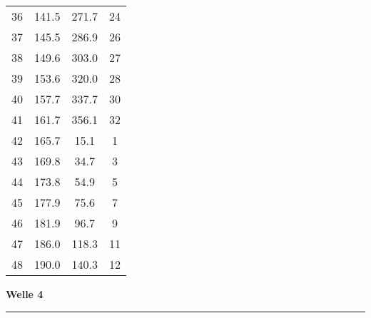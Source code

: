 \documentclass[10pt, a4paper]{article}
\begin{document}
\begin{center}
\begin{tabular}{c|c|c|c}
		36 & 141.5 & 271.7 & 24 \\
		37 & 145.5 & 286.9 & 26 \\
		38 & 149.6 & 303.0 & 27 \\
		39 & 153.6 & 320.0 & 28 \\
		40 & 157.7 & 337.7 & 30 \\
		41 & 161.7 & 356.1 & 32 \\
		42 & 165.7 & 15.1 & 1 \\
		43 & 169.8 & 34.7 & 3 \\
		44 & 173.8 & 54.9 & 5 \\
		45 & 177.9 & 75.6 & 7 \\
		46 & 181.9 & 96.7 & 9 \\
		47 & 186.0 & 118.3 & 11 \\
		48 & 190.0 & 140.3 & 12 \\
	\end{tabular}
\end{center}
\newpage
\centerline{{\bf Welle 4} }
\rule{1.0\textwidth}{0.5mm}
\end{document}
